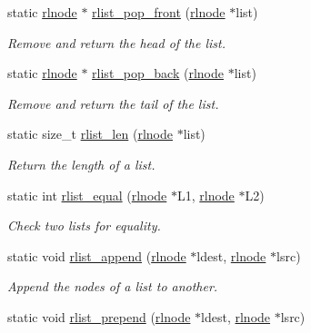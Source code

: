 \begin{DoxyCompactItemize}
static \hyperlink{group__rlists_ga8f6244877f7ce2322c90525217ea6e7a}{rlnode} $\ast$ \hyperlink{group__rlists_ga5cc2be48f94a7573fb8952356c6ba7d1}{rlist\-\_\-pop\-\_\-front} (\hyperlink{group__rlists_ga8f6244877f7ce2322c90525217ea6e7a}{rlnode} $\ast$list)
\begin{DoxyCompactList}\small\item\em Remove and return the head of the list. \end{DoxyCompactList}\item 
static \hyperlink{group__rlists_ga8f6244877f7ce2322c90525217ea6e7a}{rlnode} $\ast$ \hyperlink{group__rlists_ga55f998d5871e6e563b4320392995a6c5}{rlist\-\_\-pop\-\_\-back} (\hyperlink{group__rlists_ga8f6244877f7ce2322c90525217ea6e7a}{rlnode} $\ast$list)
\begin{DoxyCompactList}\small\item\em Remove and return the tail of the list. \end{DoxyCompactList}\item 
static size\-\_\-t \hyperlink{group__rlists_ga107b2689c5811f7dbab8f334812b46d0}{rlist\-\_\-len} (\hyperlink{group__rlists_ga8f6244877f7ce2322c90525217ea6e7a}{rlnode} $\ast$list)
\begin{DoxyCompactList}\small\item\em Return the length of a list. \end{DoxyCompactList}\item 
static int \hyperlink{group__rlists_gac02a33ca2f63b5dc5e9597a54da32cf4}{rlist\-\_\-equal} (\hyperlink{group__rlists_ga8f6244877f7ce2322c90525217ea6e7a}{rlnode} $\ast$L1, \hyperlink{group__rlists_ga8f6244877f7ce2322c90525217ea6e7a}{rlnode} $\ast$L2)
\begin{DoxyCompactList}\small\item\em Check two lists for equality. \end{DoxyCompactList}\item 
static void \hyperlink{group__rlists_ga7f5989d7ec35645d6bbb1c15cd438532}{rlist\-\_\-append} (\hyperlink{group__rlists_ga8f6244877f7ce2322c90525217ea6e7a}{rlnode} $\ast$ldest, \hyperlink{group__rlists_ga8f6244877f7ce2322c90525217ea6e7a}{rlnode} $\ast$lsrc)
\begin{DoxyCompactList}\small\item\em Append the nodes of a list to another. \end{DoxyCompactList}\item 
static void \hyperlink{group__rlists_ga906dea2f5a25116f979ba6585266453e}{rlist\-\_\-prepend} (\hyperlink{group__rlists_ga8f6244877f7ce2322c90525217ea6e7a}{rlnode} $\ast$ldest, \hyperlink{group__rlists_ga8f6244877f7ce2322c90525217ea6e7a}{rlnode} $\ast$lsrc)

\end{DoxyCompactItemize}

